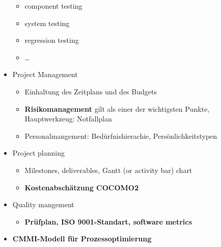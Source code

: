 \begin{itemize}
\begin{itemize}
        \item component testing
        \item system testing
        \item regression testing
        \item \dots
    \end{itemize}
    \item Project Management
    \begin{itemize}
        \item Einhaltung des Zeitplans und des Budgets
        \item \textbf{Risikomanagement} gilt als einer der wichtigsten Punkte, Hauptwerkzeug: Notfallplan
        \item Personalmangement: Bedürfnishierachie, Persönlichkeitstypen
    \end{itemize}
    \item Project planning
    \begin{itemize}
        \item Milestones, deliverables, Gantt (or activity bar) chart
        \item \textbf{Kostenabschätzung COCOMO2}
    \end{itemize}
    \item Quality mangement 
    \begin{itemize}
        \item \textbf{Prüfplan, ISO 9001-Standart, software metrics }
    \end{itemize}
    \item \textbf{CMMI-Modell für Prozessoptimierung}
\end{itemize}
